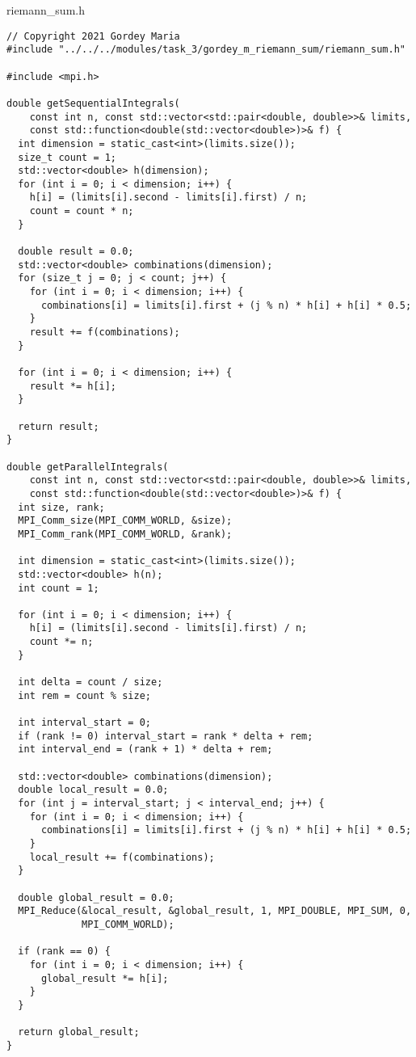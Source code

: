 \documentclass{report}
\begin{document}
riemann\_sum.h
\begin{lstlisting}
// Copyright 2021 Gordey Maria
#include "../../../modules/task_3/gordey_m_riemann_sum/riemann_sum.h"

#include <mpi.h>

double getSequentialIntegrals(
    const int n, const std::vector<std::pair<double, double>>& limits,
    const std::function<double(std::vector<double>)>& f) {
  int dimension = static_cast<int>(limits.size());
  size_t count = 1;
  std::vector<double> h(dimension);
  for (int i = 0; i < dimension; i++) {
    h[i] = (limits[i].second - limits[i].first) / n;
    count = count * n;
  }

  double result = 0.0;
  std::vector<double> combinations(dimension);
  for (size_t j = 0; j < count; j++) {
    for (int i = 0; i < dimension; i++) {
      combinations[i] = limits[i].first + (j % n) * h[i] + h[i] * 0.5;
    }
    result += f(combinations);
  }

  for (int i = 0; i < dimension; i++) {
    result *= h[i];
  }

  return result;
}

double getParallelIntegrals(
    const int n, const std::vector<std::pair<double, double>>& limits,
    const std::function<double(std::vector<double>)>& f) {
  int size, rank;
  MPI_Comm_size(MPI_COMM_WORLD, &size);
  MPI_Comm_rank(MPI_COMM_WORLD, &rank);

  int dimension = static_cast<int>(limits.size());
  std::vector<double> h(n);
  int count = 1;

  for (int i = 0; i < dimension; i++) {
    h[i] = (limits[i].second - limits[i].first) / n;
    count *= n;
  }

  int delta = count / size;
  int rem = count % size;

  int interval_start = 0;
  if (rank != 0) interval_start = rank * delta + rem;
  int interval_end = (rank + 1) * delta + rem;

  std::vector<double> combinations(dimension);
  double local_result = 0.0;
  for (int j = interval_start; j < interval_end; j++) {
    for (int i = 0; i < dimension; i++) {
      combinations[i] = limits[i].first + (j % n) * h[i] + h[i] * 0.5;
    }
    local_result += f(combinations);
  }

  double global_result = 0.0;
  MPI_Reduce(&local_result, &global_result, 1, MPI_DOUBLE, MPI_SUM, 0,
             MPI_COMM_WORLD);

  if (rank == 0) {
    for (int i = 0; i < dimension; i++) {
      global_result *= h[i];
    }
  }

  return global_result;
}

\end{lstlisting}
\end{document}
